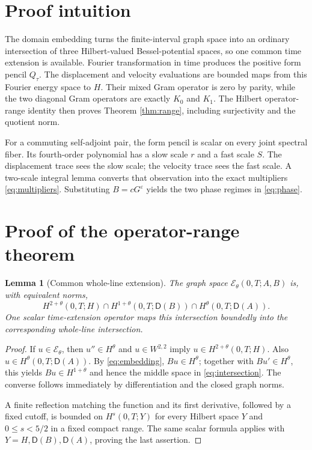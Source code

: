 \documentclass[11pt]{article}
\newtheorem{lemma}{Lemma}
\theoremstyle{remark}
\newcommand{\cE}{\mathcal E}
\newcommand{\Dom}{\mathsf D}
\begin{document}
\section{Proof intuition}

The domain embedding turns the finite-interval graph space into an ordinary
intersection of three Hilbert-valued Bessel-potential spaces, so one common
time extension is available.  Fourier transformation in time produces the
positive form pencil $Q_\tau$.  The displacement and velocity evaluations
are bounded maps from this Fourier energy space to $H$.  Their mixed Gram
operator is zero by parity, while the two diagonal Gram operators are exactly
$K_0$ and $K_1$.  The Hilbert operator-range identity then proves
Theorem \ref{thm:range}, including surjectivity and the quotient norm.

For a commuting self-adjoint pair, the form pencil is scalar on every joint
spectral fiber.  Its fourth-order polynomial has a slow scale $r$ and a fast
scale $S$.  The displacement trace sees the slow scale; the velocity trace
sees the fast scale.  A two-scale integral lemma converts that observation
into the exact multipliers \eqref{eq:multipliers}.  Substituting
$B=cG^\varepsilon$ yields the two phase regimes in \eqref{eq:phase}.

\section{Proof of the operator-range theorem}

\begin{lemma}[Common whole-line extension]\label{lem:extension}
The graph space $\cE_\theta(0,T;A,B)$ is, with equivalent norms,
\begin{equation}\label{eq:intersection}
 H^{2+\theta}(0,T;H)
 \cap H^{1+\theta}(0,T;\Dom(B))
 \cap H^\theta(0,T;\Dom(A)).
\end{equation}
One scalar time-extension operator maps this intersection boundedly into the
corresponding whole-line intersection.
\end{lemma}

\begin{proof}
If $u\in\cE_\theta$, then $u''\in H^\theta$ and $u\in W^{2,2}$ imply
$u\in H^{2+\theta}(0,T;H)$.  Also $u\in H^\theta(0,T;\Dom(A))$.
By \eqref{eq:embedding}, $Bu\in H^\theta$; together with
$Bu'\in H^\theta$, this yields $Bu\in H^{1+\theta}$ and hence the middle
space in \eqref{eq:intersection}.  The converse follows immediately by
differentiation and the closed graph norms.

A finite reflection matching the function and its first derivative, followed
by a fixed cutoff, is bounded on $H^s(0,T;Y)$ for every Hilbert space $Y$ and
$0\le s<5/2$ in a fixed compact range.  The same scalar formula applies with
$Y=H,\Dom(B),\Dom(A)$, proving the last assertion.
\end{proof}
\end{document}
